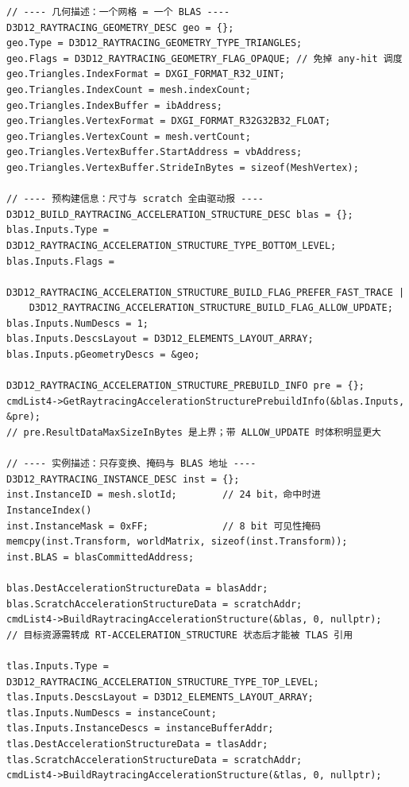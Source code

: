 \documentclass[12pt,a4paper,fontset=fandol]{ctexbook}
\begin{document}
\begin{lstlisting}[style=cppstyle,caption={DXR 的两级加速结构构建：先问尺寸，再建 BLAS 与 TLAS},label={lst:ch13-blas}]
// ---- 几何描述：一个网格 = 一个 BLAS ----
D3D12_RAYTRACING_GEOMETRY_DESC geo = {};
geo.Type = D3D12_RAYTRACING_GEOMETRY_TYPE_TRIANGLES;
geo.Flags = D3D12_RAYTRACING_GEOMETRY_FLAG_OPAQUE; // 免掉 any-hit 调度
geo.Triangles.IndexFormat = DXGI_FORMAT_R32_UINT;
geo.Triangles.IndexCount = mesh.indexCount;
geo.Triangles.IndexBuffer = ibAddress;
geo.Triangles.VertexFormat = DXGI_FORMAT_R32G32B32_FLOAT;
geo.Triangles.VertexCount = mesh.vertCount;
geo.Triangles.VertexBuffer.StartAddress = vbAddress;
geo.Triangles.VertexBuffer.StrideInBytes = sizeof(MeshVertex);

// ---- 预构建信息：尺寸与 scratch 全由驱动报 ----
D3D12_BUILD_RAYTRACING_ACCELERATION_STRUCTURE_DESC blas = {};
blas.Inputs.Type = D3D12_RAYTRACING_ACCELERATION_STRUCTURE_TYPE_BOTTOM_LEVEL;
blas.Inputs.Flags =
    D3D12_RAYTRACING_ACCELERATION_STRUCTURE_BUILD_FLAG_PREFER_FAST_TRACE |
    D3D12_RAYTRACING_ACCELERATION_STRUCTURE_BUILD_FLAG_ALLOW_UPDATE;
blas.Inputs.NumDescs = 1;
blas.Inputs.DescsLayout = D3D12_ELEMENTS_LAYOUT_ARRAY;
blas.Inputs.pGeometryDescs = &geo;

D3D12_RAYTRACING_ACCELERATION_STRUCTURE_PREBUILD_INFO pre = {};
cmdList4->GetRaytracingAccelerationStructurePrebuildInfo(&blas.Inputs, &pre);
// pre.ResultDataMaxSizeInBytes 是上界；带 ALLOW_UPDATE 时体积明显更大

// ---- 实例描述：只存变换、掩码与 BLAS 地址 ----
D3D12_RAYTRACING_INSTANCE_DESC inst = {};
inst.InstanceID = mesh.slotId;        // 24 bit，命中时进 InstanceIndex()
inst.InstanceMask = 0xFF;             // 8 bit 可见性掩码
memcpy(inst.Transform, worldMatrix, sizeof(inst.Transform));
inst.BLAS = blasCommittedAddress;

blas.DestAccelerationStructureData = blasAddr;
blas.ScratchAccelerationStructureData = scratchAddr;
cmdList4->BuildRaytracingAccelerationStructure(&blas, 0, nullptr);
// 目标资源需转成 RT-ACCELERATION_STRUCTURE 状态后才能被 TLAS 引用

tlas.Inputs.Type = D3D12_RAYTRACING_ACCELERATION_STRUCTURE_TYPE_TOP_LEVEL;
tlas.Inputs.DescsLayout = D3D12_ELEMENTS_LAYOUT_ARRAY;
tlas.Inputs.NumDescs = instanceCount;
tlas.Inputs.InstanceDescs = instanceBufferAddr;
tlas.DestAccelerationStructureData = tlasAddr;
tlas.ScratchAccelerationStructureData = scratchAddr;
cmdList4->BuildRaytracingAccelerationStructure(&tlas, 0, nullptr);
\end{lstlisting}
\end{document}
